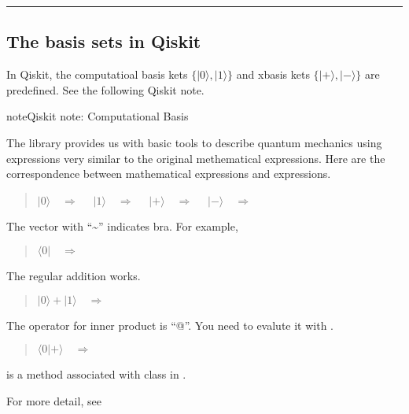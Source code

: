 \documentclass[letterpaper,10pt,english]{jupyterBook}
\begin{document}
\bigskip\hrule\bigskip



\subsection{The basis sets in Qiskit}
\label{\detokenize{qubit/purestates:the-basis-sets-in-qiskit}}
\sphinxAtStartPar
In Qiskit, the computatioal basis kets \(\{|0\rangle, |1\rangle\}\) and x\sphinxhyphen{}basis kets \(\{|+\rangle, |-\rangle\}\) are predefined.  See the following Qiskit note.

\begin{sphinxadmonition}{note}{Qiskit note: Computational Basis}

\sphinxAtStartPar
The  library provides us with basic tools to describe quantum mechanics using expressions very similar to the original methematical expressions.  Here are the correspondence between mathematical expressions and  expressions.
\begin{quote}

\sphinxAtStartPar
\(|0\rangle \quad \Rightarrow \quad\) \(|1\rangle \quad \Rightarrow \quad\) \(|+\rangle \quad \Rightarrow \quad\) \(|-\rangle \quad \Rightarrow \quad\) 
\end{quote}

\sphinxAtStartPar
The vector with “\textasciitilde{}” indicates bra.  For example,
\begin{quote}

\sphinxAtStartPar
\(\langle 0| \quad  \Rightarrow \quad\) 
\end{quote}

\sphinxAtStartPar
The regular addition works.
\begin{quote}

\sphinxAtStartPar
\(|0\rangle + |1\rangle \quad \Rightarrow \quad\)  
\end{quote}

\sphinxAtStartPar
The operator for inner product is “@”. You need to evalute it with .
\begin{quote}

\sphinxAtStartPar
\(\langle 0 | + \rangle \quad \Rightarrow \quad\)  
\end{quote}

\sphinxAtStartPar
{} is a method associated with  class in .

\sphinxAtStartPar
For more detail, see 
\end{sphinxadmonition}
\end{document}

